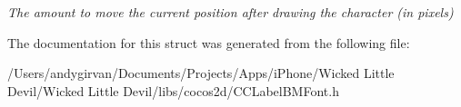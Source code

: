 \begin{DoxyCompactItemize}
\begin{DoxyCompactList}\small\item\em The amount to move the current position after drawing the character (in pixels) \end{DoxyCompactList}\end{DoxyCompactItemize}


The documentation for this struct was generated from the following file\-:\begin{DoxyCompactItemize}
\item 
/\-Users/andygirvan/\-Documents/\-Projects/\-Apps/i\-Phone/\-Wicked Little Devil/\-Wicked Little Devil/libs/cocos2d/C\-C\-Label\-B\-M\-Font.\-h\end{DoxyCompactItemize}
